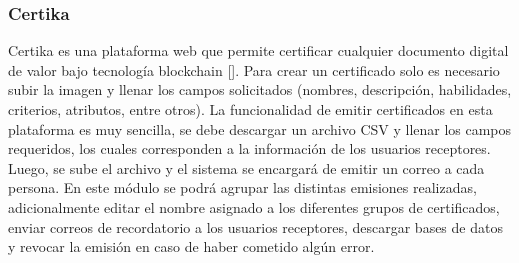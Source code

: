 \subsubsection{Certika}
Certika es una plataforma web que permite certificar cualquier documento digital de valor bajo tecnología blockchain [\cite{88}]. Para crear un certificado solo es necesario subir la imagen y llenar los campos solicitados (nombres, descripción, habilidades, criterios, atributos, entre otros). La funcionalidad de emitir certificados en esta plataforma es muy sencilla, se debe descargar un archivo CSV y llenar los campos requeridos, los cuales corresponden a la información de los usuarios receptores. Luego, se sube el archivo y el sistema se encargará de emitir un correo a cada persona. En este módulo se podrá agrupar las distintas emisiones realizadas, adicionalmente editar el nombre asignado a los diferentes grupos de certificados, enviar correos de recordatorio a los usuarios receptores, descargar bases de datos y revocar la emisión en caso de haber cometido algún error.


%
%

